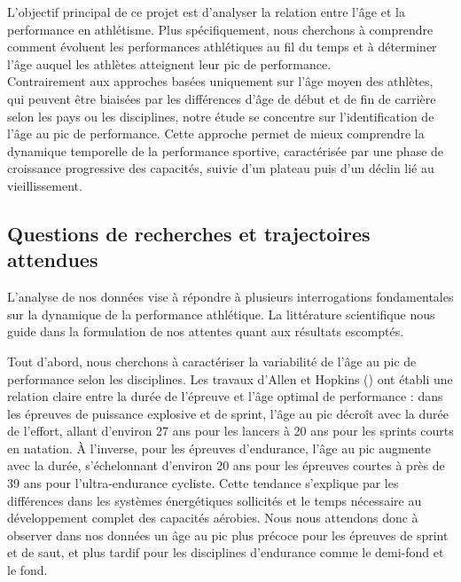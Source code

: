 \documentclass[
  french,
  11pt,
  a4paper,
]{article}
\begin{document}
L'objectif principal de ce projet est d'analyser la relation entre l'âge
et la performance en athlétisme. Plus spécifiquement, nous cherchons à
comprendre comment évoluent les performances athlétiques au fil du temps
et à déterminer l'âge auquel les athlètes atteignent leur pic de
performance.\\

Contrairement aux approches basées uniquement sur l'âge moyen des
athlètes, qui peuvent être biaisées par les différences d'âge de début
et de fin de carrière selon les pays ou les disciplines, notre étude se
concentre sur l'identification de l'âge au pic de performance. Cette
approche permet de mieux comprendre la dynamique temporelle de la
performance sportive, caractérisée par une phase de croissance
progressive des capacités, suivie d'un plateau puis d'un déclin lié au
vieillissement.

\subsection*{Questions de recherches et trajectoires
attendues}\label{questions-de-recherches-et-trajectoires-attendues}

L'analyse de nos données vise à répondre à plusieurs interrogations
fondamentales sur la dynamique de la performance athlétique. La
littérature scientifique nous guide dans la formulation de nos attentes
quant aux résultats escomptés.

Tout d'abord, nous cherchons à caractériser la variabilité de l'âge au
pic de performance selon les disciplines. Les travaux d'Allen et Hopkins
() ont établi une
relation claire entre la durée de l'épreuve et l'âge optimal de
performance : dans les épreuves de puissance explosive et de sprint,
l'âge au pic décroît avec la durée de l'effort, allant d'environ 27 ans
pour les lancers à 20 ans pour les sprints courts en natation. À
l'inverse, pour les épreuves d'endurance, l'âge au pic augmente avec la
durée, s'échelonnant d'environ 20 ans pour les épreuves courtes à près
de 39 ans pour l'ultra-endurance cycliste. Cette tendance s'explique par
les différences dans les systèmes énergétiques sollicités et le temps
nécessaire au développement complet des capacités aérobies. Nous nous
attendons donc à observer dans nos données un âge au pic plus précoce
pour les épreuves de sprint et de saut, et plus tardif pour les
disciplines d'endurance comme le demi-fond et le fond.
\end{document}
